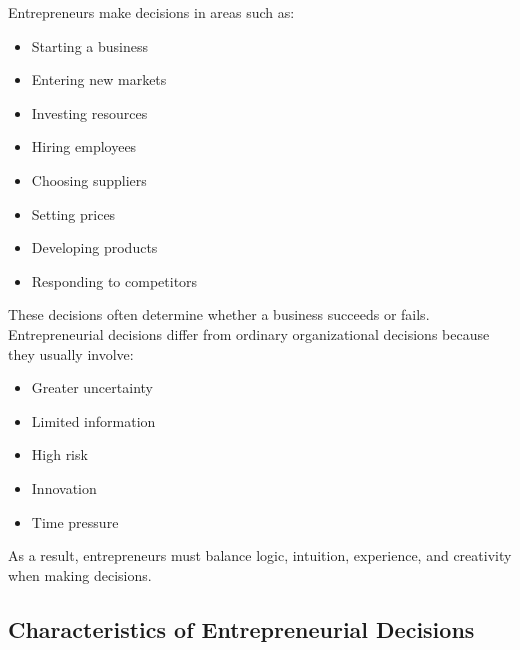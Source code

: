 \documentclass[12pt,a4paper]{article}
\begin{document}
Entrepreneurs make decisions in areas such as:
\begin{itemize}
    \item Starting a business
    \item Entering new markets
    \item Investing resources
    \item Hiring employees
    \item Choosing suppliers
    \item Setting prices
    \item Developing products
    \item Responding to competitors
\end{itemize}

These decisions often determine whether a business succeeds or fails. Entrepreneurial decisions differ from ordinary organizational decisions because they usually involve:
\begin{itemize}
    \item Greater uncertainty
    \item Limited information
    \item High risk
    \item Innovation
    \item Time pressure
\end{itemize}
As a result, entrepreneurs must balance logic, intuition, experience, and creativity when making decisions.

\subsection*{Characteristics of Entrepreneurial Decisions}
\end{document}
